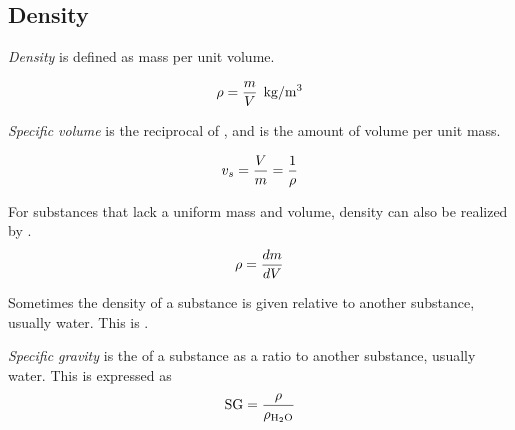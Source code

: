 \subsection{Density}\label{subsec:Density}
\begin{definition}[Density]\label{def:Density}
  \emph{Density} is defined as mass per unit volume.

  \begin{equation}\label{eq:Density}
    \Density = \frac{\Mass}{\Volume} \:\: \si[per-mode=symbol]{\kilo\gram\per\meter\cubed}
  \end{equation}
\end{definition}

\begin{definition}\label{def:Specific_Volume}
  \emph{Specific volume} is the reciprocal of , and is the amount of volume per unit mass.

  \begin{equation}\label{eq:Specific_Volume}
    \SpecificVolume = \frac{\Volume}{\Mass} = \frac{1}{\Density}
  \end{equation}
\end{definition}

For substances that lack a uniform mass and volume, density can also be realized by .
\begin{equation}\label{eq:Differential_Density}
  \Density = \frac{d \Mass}{d \Volume}
\end{equation}

Sometimes the density of a substance is given relative to another substance, usually water.
This is .
\begin{definition}\label{def:Specific_Gravity}
  \emph{Specific gravity} is the  of a substance as a ratio to another substance, usually water.
  This is expressed as
  \begin{equation}\label{eq:Specific_Gravity}
    \SpecificGravity = \frac{\Density}{\Density_{\mathrm{H_{2}O}}}
  \end{equation}
\end{definition}



